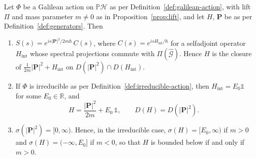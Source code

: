 \begin{theorem}\label{thm:free-hamiltonian}
	Let $\Phi$ be a Galilean action on $\mathbb{P}\mathcal{H}$ as per Definition~\ref{def:galilean-action}, with lift $\Pi$ and mass parameter $m\neq0$ as in Proposition~\ref{prop:lift}, and let $H$, $\mathbf{P}$ be as per Definition~\ref{def:generators}. Then
	\begin{enumerate}
		\item $S(s)=e^{is|\mathbf{P}|^2/2m\hbar}\,C(s)$, where $C(s)=e^{isH_{\mathrm{int}}/\hbar}$ for a selfadjoint operator $H_{\mathrm{int}}$ whose spectral projections commute with $\Pi(\widehat{\mathcal{G}})$. Hence $H$ is the closure of $\tfrac{1}{2m}|\mathbf{P}|^2+H_{\mathrm{int}}$ on $D(|\mathbf{P}|^2)\cap D(H_{\mathrm{int}})$.
		\item If $\Phi$ is irreducible as per Definition~\ref{def:irreducible-action}, then $H_{\mathrm{int}}=E_0\mathbb{1}$ for some $E_0\in\mathbb{R}$, and
		\begin{equation}
			H=\frac{|\mathbf{P}|^2}{2m}+E_0\,\mathbb{1}, \qquad D(H)=D(|\mathbf{P}|^2).
			\label{eq:free-hamiltonian}
		\end{equation}
		\item $\sigma(|\mathbf{P}|^2)=[0,\infty)$. Hence, in the irreducible case, $\sigma(H)=[E_0,\infty)$ if $m>0$ and $\sigma(H)=(-\infty,E_0]$ if $m<0$, so that $H$ is bounded below if and only if $m>0$.
	\end{enumerate}
\end{theorem}

